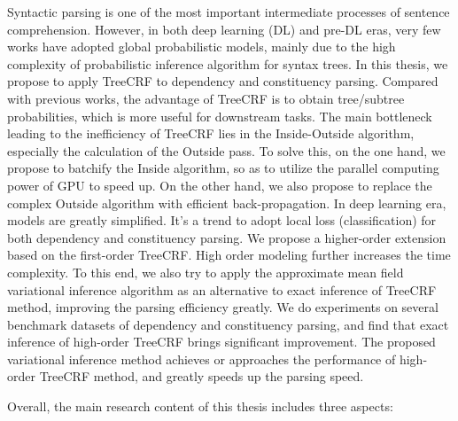 
\begin{eabstract}
	Syntactic parsing is one of the most important intermediate processes of sentence comprehension.
	However, in both deep learning (DL) and pre-DL eras, very few works have adopted global probabilistic models, mainly due to the high complexity of probabilistic inference algorithm for syntax trees.
	In this thesis, we propose to apply TreeCRF to dependency and constituency parsing.
	Compared with previous works, the advantage of TreeCRF is to obtain tree/subtree probabilities, which is more useful for downstream tasks.
	The main bottleneck leading to the inefficiency of TreeCRF lies in the Inside-Outside algorithm, especially the calculation of the Outside pass.
	To solve this, on the one hand, we propose to batchify the Inside algorithm, so as to utilize the parallel computing power of GPU to speed up.
	On the other hand, we also propose to replace the complex Outside algorithm with efficient back-propagation.
	In deep learning era, models are greatly simplified.
	It's a trend to adopt local loss (classification) for both dependency and constituency parsing.
	We propose a higher-order extension based on the first-order TreeCRF.
	High order modeling further increases the time complexity.
	To this end, we also try to apply the approximate mean field variational inference algorithm as an alternative to exact inference of TreeCRF method, improving the parsing efficiency greatly.
	We do experiments on several benchmark datasets of dependency and constituency parsing, and find that exact inference of high-order TreeCRF brings significant improvement.
	The proposed variational inference method achieves or approaches the performance of high-order TreeCRF method, and greatly speeds up the parsing speed.
	
	Overall, the main research content of this thesis includes three aspects:
	

\end{eabstract}
